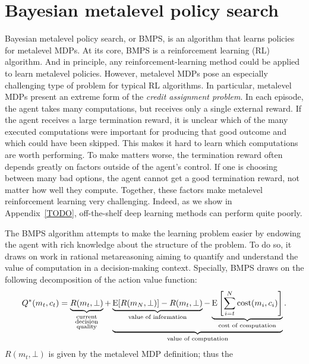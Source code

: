 \section{Bayesian metalevel policy search}\label{sec:BMPS}

Bayesian metalevel policy search, or BMPS, is an algorithm that learns policies for metalevel MDPs. At its core, BMPS is a reinforcement learning (RL) algorithm. And in principle, any reinforcement-learning method could be applied to learn metalevel policies. However, metalevel MDPs pose an especially challenging type of problem for typical RL algorithms. In particular, metalevel MDPs present an extreme form of the \emph{credit assignment problem}. In each episode, the agent takes many computations, but receives only a single external reward. If the agent receives a large termination reward, it is unclear which of the many executed computations were important for producing that good outcome and which could have been skipped. This makes it hard to learn which computations are worth performing. To make matters worse, the termination reward often depends greatly on factors outside of the agent's control. If one is choosing between many bad options, the agent cannot get a good termination reward, not matter how well they compute. Together, these factors make metalevel reinforcement learning very challenging. Indeed, as we show in Appendix~\ref{TODO}, off-the-shelf deep learning methods can perform quite poorly.

The BMPS algorithm attempts to make the learning problem easier by endowing the agent with rich knowledge about the structure of the problem. To do so, it draws on work in rational metareasoning aiming to quantify and understand the value of computation \citep{matheson1968economic,horvitz1987reasoning,russell1991principles} in a decision-making context. Specially, BMPS draws on the following decomposition of the action value function:
%
\begin{equation}
  Q^*(m_t, c_t) = 
    \underbrace{R(m_t, \bot)
    }_{
      \substack{\text{current}\\ \text{decision}\\ \text{quality}}
    } +
    \underbrace{
      \underbrace{
        \operatorname*{E}[R(m_{N}, \bot)] - R(m_t, \bot)
      }_{
        \text{value of information}
      } - 
      \underbrace{
        \operatorname*{E}\left[\sum_{i=t}^{N} \text{cost}(m_i, c_i) \right]
      }_{
        \text{cost of computation}
      }
    }_{
      \text{value of computation}
    }.
\end{equation}
%
$R(m_t, \bot)$ is given by the metalevel MDP definition; thus the 


